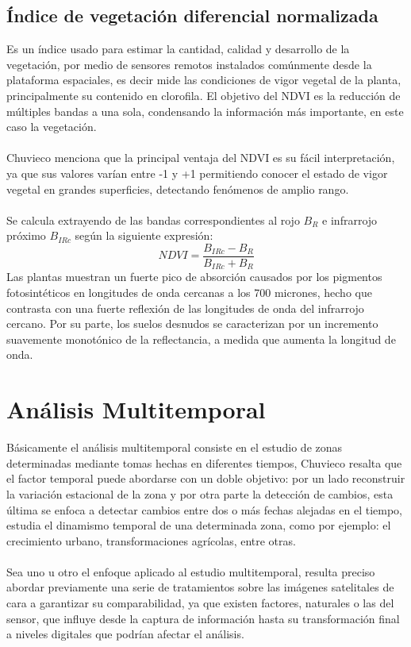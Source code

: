 \subsection{\'Indice de vegetaci\'on diferencial normalizada}
Es un \'indice usado para estimar la cantidad, calidad y desarrollo de la vegetaci\'on, por medio de sensores remotos instalados com\'unmente desde la plataforma espaciales, es decir mide las condiciones de vigor vegetal de la planta, principalmente su contenido en clorofila\cite{salinero2002teledeteccion}. El objetivo del NDVI es la reducci\'on de m\'ultiples bandas a una sola, condensando la informaci\'on m\'as importante, en este caso la vegetaci\'on.\\~\\
Chuvieco\cite{salinero2002teledeteccion} menciona que la principal ventaja del NDVI es su f\'acil interpretaci\'on, ya que sus
valores var\'ian entre -1 y +1 permitiendo conocer el estado de vigor vegetal en grandes superficies, detectando fen\'omenos de amplio rango.\\~\\
Se calcula extrayendo de las bandas correspondientes al rojo $B_{R}$ e infrarrojo pr\'oximo $B_{IRc}$ seg\'un la siguiente expresi\'on:
	\begin{equation}
	\label{e:ndvi}
	NDVI=\dfrac{B_{IRc}-B_{R}}{B_{IRc}+B_{R}}
	\end{equation}
Las plantas muestran un fuerte pico de absorci\'on causados por los pigmentos fotosint\'eticos en longitudes de onda cercanas a los 700 micrones, hecho que contrasta con una fuerte reflexi\'on de las longitudes de onda del infrarrojo cercano. Por su parte, los suelos desnudos se caracterizan por un incremento suavemente monot\'onico de la reflectancia, a medida que aumenta la longitud de onda.

\section{An\'alisis Multitemporal}
B\'asicamente el an\'alisis multitemporal consiste en el estudio de zonas determinadas mediante tomas hechas en diferentes tiempos, Chuvieco \cite{salinero2002teledeteccion} resalta que el factor temporal puede abordarse con un doble objetivo: por un lado reconstruir la variaci\'on estacional de la zona y por otra parte la detecci\'on de cambios, esta \'ultima se enfoca a detectar cambios entre dos o m\'as
fechas alejadas en el tiempo, estudia el dinamismo temporal de una determinada zona, como por ejemplo: el crecimiento urbano, transformaciones agrícolas, entre otras.\\~\\
Sea uno u otro el enfoque aplicado al estudio multitemporal, resulta preciso abordar previamente una serie de tratamientos sobre las im\'agenes satelitales de cara a garantizar su comparabilidad, ya que existen factores, naturales o las del sensor, que influye desde la captura de informaci\'on hasta su transformaci\'on final a niveles digitales que podr\'ian afectar el an\'alisis.


